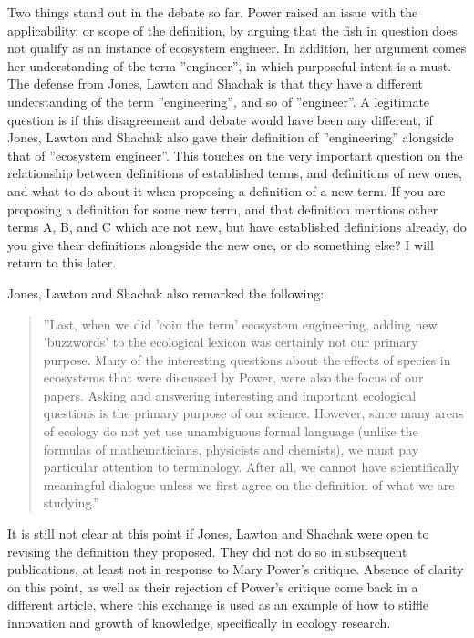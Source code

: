 \documentclass[graybox,envcountchap,sectrefs]{svmono}
\begin{document}
Two things stand out in the debate so far. Power raised an issue with the applicability, or scope of the definition, by arguing that the fish in question does not qualify as an instance of ecosystem engineer. In addition, her argument comes her understanding of the term ''engineer'', in which purposeful intent is a must. The defense from Jones, Lawton and Shachak is that they have a different understanding of the term ''engineering'', and so of ''engineer''. A legitimate question is if this disagreement and debate would have been any different, if  Jones, Lawton and Shachak also gave their definition of ''engineering'' alongside that of ''ecosystem engineer''. This touches on the very important question on the relationship between definitions of established terms, and definitions of new ones, and what to do about it when proposing a definition of a new term. If you are proposing a definition for some new term, and that definition mentions other terms A, B, and C which are not new, but have established definitions already, do you give their definitions alongside the new one, or do something else? I will return to this later. 

Jones, Lawton and Shachak also remarked the following:
\begin{quote}
''Last, when we did 'coin the term' ecosystem engineering, adding new 'buzzwords' to the ecological lexicon was certainly not our primary purpose. Many of the interesting questions about the effects of species in ecosystems that were discussed by Power, were also the focus of our papers. Asking and answering interesting and important ecological questions is the primary purpose of our science. However, since many areas of ecology do not yet use unambiguous formal language (unlike the formulas of mathematicians, physicists and chemists), we must pay particular attention to terminology. After all, we cannot have scientifically meaningful dialogue unless we first agree on the definition of what we are studying.''
\end{quote}

It is still not clear at this point if Jones, Lawton and Shachak were open to revising the definition they proposed. They did not do so in subsequent publications, at least not in response to Mary Power's critique. Absence of clarity on this point, as well as their rejection of Power's critique come back in a different article, where this exchange is used as an example of how to stiffle innovation and growth of knowledge, specifically in ecology research.
\end{document}
